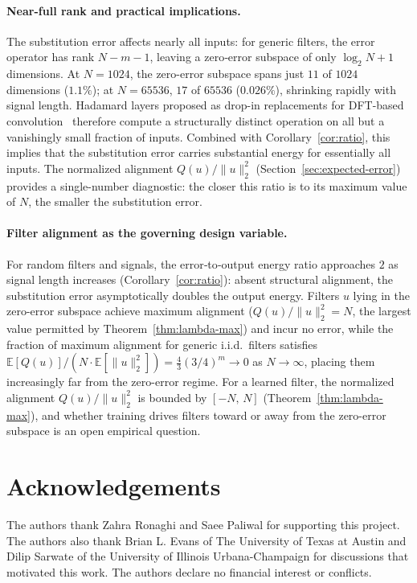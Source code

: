 \documentclass[11pt]{article}
\begin{document}
\paragraph{Near-full rank and practical implications.}
The substitution error affects nearly all inputs: for generic filters, the error operator has rank $N-m-1$, leaving a zero‑error subspace of only $\log_2 N + 1$ dimensions. At $N=1024$, the zero-error subspace spans just $11$ of $1024$ dimensions ($1.1\%$); at $N=65536$, $17$ of $65536$ ($0.026\%$), shrinking rapidly with signal length. Hadamard layers proposed as drop-in replacements for DFT-based convolution~\cite{pan2021fast, pan2022block, pan2023htlayer} therefore compute a structurally distinct operation on all but a vanishingly small fraction of inputs. Combined with Corollary~\ref{cor:ratio}, this implies that the substitution error carries substantial energy for essentially all inputs. The normalized alignment $Q(u)/\|u\|_2^2$ (Section~\ref{sec:expected-error}) provides a single-number diagnostic: the closer this ratio is to its maximum value of $N$, the smaller the substitution error.

\paragraph{Filter alignment as the governing design variable.}
For random filters and signals, the error‑to‑output energy ratio approaches $2$ as signal length increases (Corollary~\ref{cor:ratio}): absent structural alignment, the substitution error asymptotically doubles the output energy. Filters $u$ lying in the zero-error subspace achieve maximum alignment ($Q(u)/\|u\|_2^2 = N$, the largest value permitted by Theorem~\ref{thm:lambda-max}) and incur no error, while the fraction of maximum alignment for generic i.i.d.\ filters satisfies $\mathbb{E}[Q(u)]/(N\cdot\mathbb{E}[\|u\|_2^2]) = \tfrac{4}{3}(3/4)^m \to 0$ as $N\to\infty$, placing them increasingly far from the zero-error regime. For a learned filter, the normalized alignment $Q(u)/\|u\|_2^2$ is bounded by $[-N,\,N]$ (Theorem~\ref{thm:lambda-max}), and whether training drives filters toward or away from the zero-error subspace is an open empirical question.


\section{Acknowledgements}

The authors thank Zahra Ronaghi and Saee Paliwal for supporting this project. The authors also thank Brian L. Evans of The University of Texas at Austin and Dilip Sarwate of the University of Illinois Urbana-Champaign for discussions that motivated this work. The authors declare no financial interest or conflicts.
\end{document}
